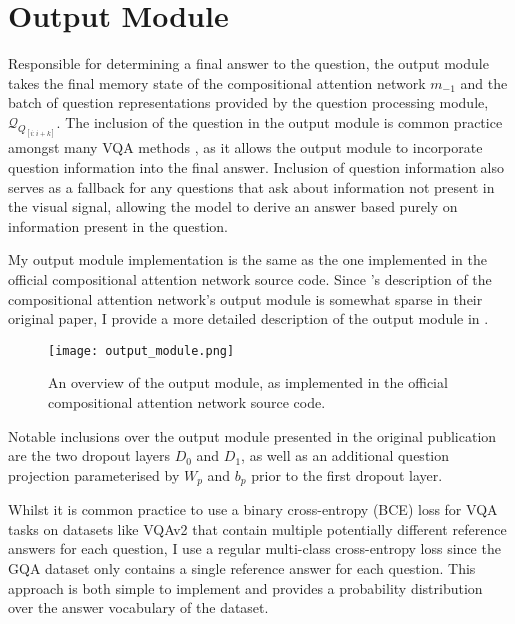 \section{Output Module}
\label{section:output_module}

Responsible for determining a final answer to the question, the output module takes the final memory state of the compositional attention network \(m_{-1}\) and the batch of question representations provided by the question processing module, \(\mathcal{Q}_{Q_{[i:i+k]}}\). The inclusion of the question in the output module is common practice amongst many VQA methods \cite{hudson2018compositional, li2019relation, huang2020aligned}, as it allows the output module to incorporate question information into the final answer. Inclusion of question information also serves as a fallback for any questions that ask about information not present in the visual signal, allowing the model to derive an answer based purely on information present in the question.

My output module implementation is the same as the one implemented in the official compositional attention network source code. Since \citeauthor{hudson2018compositional}'s description of the compositional attention network's output module is somewhat sparse in their original paper, I provide a more detailed description of the output module in \figureautorefname{ \ref{fig:output_module}}.

\begin{figure}[htbp]
    \centering
    \texttt{[image: output\_module.png]}
    \caption[An overview of my model's output module.]{An overview of the output module, as implemented in the official compositional attention network source code.}
    \label{fig:output_module}
\end{figure}

Notable inclusions over the output module presented in the original publication are the two dropout layers \(D_0\) and \(D_1\), as well as an additional question projection parameterised by \(W_p\) and \(b_p\) prior to the first dropout layer. 

Whilst it is common practice to use a binary cross-entropy (BCE) loss for VQA tasks \cite{teney2018tips} on datasets like VQAv2 \cite{goyal2017making} that contain multiple potentially different reference answers for each question, I use a regular multi-class cross-entropy loss since the GQA dataset only contains a single reference answer for each question. This approach is both simple to implement and provides a probability distribution over the answer vocabulary of the dataset.